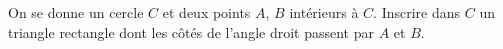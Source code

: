 On se donne un cercle $C$ et deux points $A$, $B$ intérieurs à $C$. Inscrire dans $C$ un triangle rectangle dont les côtés de l'angle droit passent par $A$ et $B$.
